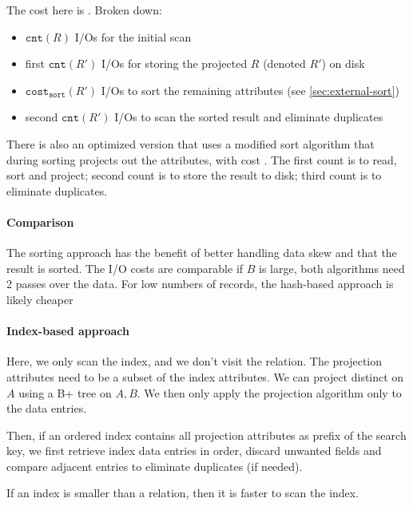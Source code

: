 The cost here is .
Broken down:
\begin{itemize}
    \item $\texttt{cnt}(R)$ I/Os for the initial scan
    \item first $\texttt{cnt}(R')$ I/Os for storing the projected $R$ (denoted $R'$) on disk
    \item $\texttt{cost}_\texttt{sort}(R')$ I/Os to sort the remaining attributes (see \ref{sec:external-sort})
    \item second $\texttt{cnt}(R')$ I/Os to scan the sorted result and eliminate duplicates
\end{itemize}


There is also an optimized version that uses a modified sort algorithm that during sorting projects out the attributes, with cost
. The first count is to read, sort and project; second count is to store the result to disk;
third count is to eliminate duplicates.


\paragraph{Comparison}
The sorting approach has the benefit of better handling data skew and that the result is sorted.
The I/O costs are comparable if $B$ is large, both algorithms need 2 passes over the data.
For low numbers of records, the hash-based approach is likely cheaper


\paragraph{Index-based approach}
Here, we only scan the index, and we don't visit the relation. The projection attributes need to be a subset of the index attributes.
We can project distinct on $A$ using a B+ tree on $A, B$.
We then only apply the projection algorithm only to the data entries.

Then, if an ordered index contains all projection attributes as prefix of the search key,
we first retrieve index data entries in order, discard unwanted fields and compare adjacent entries to eliminate duplicates (if needed).

If an index is smaller than a relation, then it is faster to scan the index.
